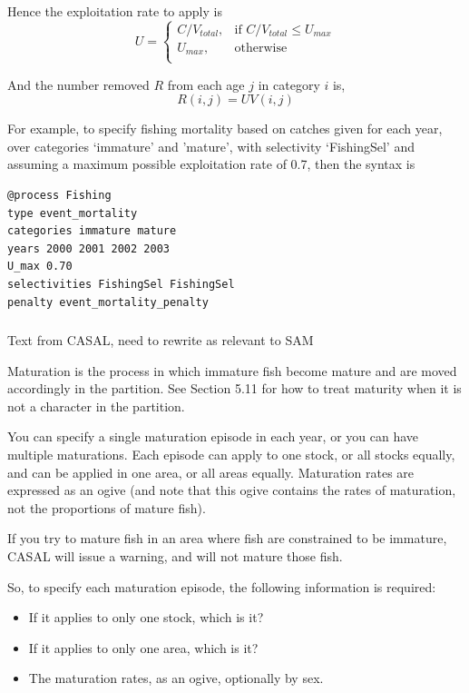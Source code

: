 Hence the exploitation rate to apply is 
\begin{equation}
U = \begin{cases}
  C/V_{total}, & \text{if $C/V_{total} \leq U_{max}$} \\
  U_{max}, & \text{otherwise}\\ 
  \end{cases} 
\end{equation}

And the number removed $R$ from each age $j$ in category $i$ is,
\begin{equation}
  R(i,j) = UV(i,j)
\end{equation}

For example, to specify fishing mortality based on catches given for each year, over categories `immature' and 'mature', with selectivity `FishingSel' and assuming a maximum possible exploitation rate of 0.7, then the syntax is

{\small{\begin{verbatim}
@process Fishing
type event_mortality
categories immature mature
years 2000 2001 2002 2003
U_max 0.70
selectivities FishingSel FishingSel
penalty event_mortality_penalty
\end{verbatim}}}

\subsubsection{}
\KL Text from CASAL, need to rewrite as relevant to SAM \KLend

Maturation is the process in which immature fish become mature and are moved accordingly in the partition. See Section 5.11 for how to treat maturity when it is not a character in the partition.

You can specify a single maturation episode in each year, or you can have multiple maturations. Each episode can apply to one stock, or all stocks equally, and can be applied in one area, or all areas equally. Maturation rates are expressed as an ogive (and note that this ogive contains the rates of maturation, not the proportions of mature fish).

If you try to mature fish in an area where fish are constrained to be immature, CASAL will issue a warning, and will not mature those fish.

So, to specify each maturation episode, the following information is required: 

\begin{itemize}
\item If it applies to only one stock, which is it?
\item If it applies to only one area, which is it?
\item The maturation rates, as an ogive, optionally by sex.
\end{itemize}




